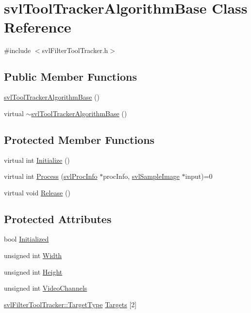 \hypertarget{classsvl_tool_tracker_algorithm_base}{}\section{svl\+Tool\+Tracker\+Algorithm\+Base Class Reference}
\label{classsvl_tool_tracker_algorithm_base}


{\ttfamily \#include $<$svl\+Filter\+Tool\+Tracker.\+h$>$}

\subsection*{Public Member Functions}
\begin{DoxyCompactItemize}
\item 
\hyperlink{classsvl_tool_tracker_algorithm_base_ad054f6bd0e301b328768d4c8ae0fbc1d}{svl\+Tool\+Tracker\+Algorithm\+Base} ()
\item 
virtual \hyperlink{classsvl_tool_tracker_algorithm_base_a12548bdb4e7c832f8fd58f7f479b8e43}{$\sim$svl\+Tool\+Tracker\+Algorithm\+Base} ()
\end{DoxyCompactItemize}
\subsection*{Protected Member Functions}
\begin{DoxyCompactItemize}
\item 
virtual int \hyperlink{classsvl_tool_tracker_algorithm_base_ae5d4343b1bd75046a72d4d1dfc1465d0}{Initialize} ()
\item 
virtual int \hyperlink{classsvl_tool_tracker_algorithm_base_acf0f8a43b15213ef72845fcac00fcabf}{Process} (\hyperlink{structsvl_proc_info}{svl\+Proc\+Info} $\ast$proc\+Info, \hyperlink{classsvl_sample_image}{svl\+Sample\+Image} $\ast$input)=0
\item 
virtual void \hyperlink{classsvl_tool_tracker_algorithm_base_afe6cd3bd32c80e292e9d64ffe7ce1716}{Release} ()
\end{DoxyCompactItemize}
\subsection*{Protected Attributes}
\begin{DoxyCompactItemize}
\item 
bool \hyperlink{classsvl_tool_tracker_algorithm_base_a6973e731afbdbcb7511b5db0366c4632}{Initialized}
\item 
unsigned int \hyperlink{classsvl_tool_tracker_algorithm_base_a5dc173e2176c626b0550a2b6d4ef8f93}{Width}
\item 
unsigned int \hyperlink{classsvl_tool_tracker_algorithm_base_a3715c7b38fb6c6ca74bcb880015dacd6}{Height}
\item 
unsigned int \hyperlink{classsvl_tool_tracker_algorithm_base_a9daba631208a063814d5401631af6d63}{Video\+Channels}
\item 
\hyperlink{classsvl_filter_tool_tracker_a3fe48b9f9a53caf0f5df9e96b1ccc38e}{svl\+Filter\+Tool\+Tracker\+::\+Target\+Type} \hyperlink{classsvl_tool_tracker_algorithm_base_a60811608667d44f5efc93eb6bedd4a90}{Targets} \mbox{[}2\mbox{]}
\end{DoxyCompactItemize}
